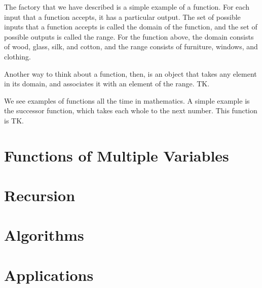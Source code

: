 \documentclass[a4paper,10pt]{report}
\begin{document}
The factory that we have described is a simple example of a \gls{function}. For
each input that a function accepts, it has a particular output. The set of
possible inputs that a function accepts is called the \gls{domain} of the
function, and the set of possible outputs is called the \gls{range}. For the
function above, the domain consists of wood, glass, silk, and cotton, and the
range consists of furniture, windows, and clothing.

Another way to think about a function, then, is an object that takes any
element in its domain, and associates it with an element of the range. TK.

We see examples of functions all the time in mathematics. A simple example is
the successor function, which takes each whole to the next number. This
function is TK.

\chapter{Functions of Multiple Variables}

\chapter{Recursion}

\chapter{Algorithms}

\chapter{Applications}


\printglossaries

\cleardoublepage
{}
\listoffigures
\end{document}
